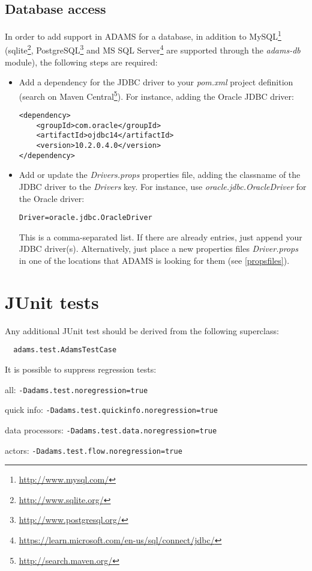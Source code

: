 \section{Database access}
\label{extending_adams_database_access}
In order to add support in ADAMS for a database, in addition to MySQL\footnote{\url{http://www.mysql.com/}{}} 
(sqlite\footnote{\url{http://www.sqlite.org/}{}}, PostgreSQL\footnote{\url{http://www.postgresql.org/}{}}
and MS SQL Server\footnote{\url{https://learn.microsoft.com/en-us/sql/connect/jdbc/}{}} are supported through the \textit{adams-db}
module), the following steps are required:
\begin{itemize}
	\item Add a dependency for the JDBC driver to your \textit{pom.xml} project
	definition (search on Maven Central\footnote{\url{http://search.maven.org/}{}}). 
	For instance, adding the Oracle JDBC driver: \\
\begin{verbatim}
<dependency>
    <groupId>com.oracle</groupId>
    <artifactId>ojdbc14</artifactId>
    <version>10.2.0.4.0</version>
</dependency>
\end{verbatim}
	\item Add or update the \textit{Drivers.props} properties file, adding
	the classname of the JDBC driver to the \textit{Drivers} key. For instance,
	use \textit{oracle.jdbc.OracleDriver} for the Oracle driver: \\
\begin{verbatim}
Driver=oracle.jdbc.OracleDriver
\end{verbatim}
	This is a comma-separated list. If there are already entries, just append
	your JDBC driver(s).
	Alternatively, just place a new properties files \textit{Driver.props}
	in one of the locations that ADAMS is looking for them (see \ref{propsfiles}).
\end{itemize}

\chapter{JUnit tests}
Any additional JUnit test should be derived from the following superclass:
\begin{verbatim}
  adams.test.AdamsTestCase
\end{verbatim}

It is possible to suppress regression tests:
\begin{tight_itemize}
	\item all: \texttt{-Dadams.test.noregression=true}
	\item quick info: \texttt{-Dadams.test.quickinfo.noregression=true}
	\item data processors: \texttt{-Dadams.test.data.noregression=true}
	\item actors: \texttt{-Dadams.test.flow.noregression=true}
\end{tight_itemize}

